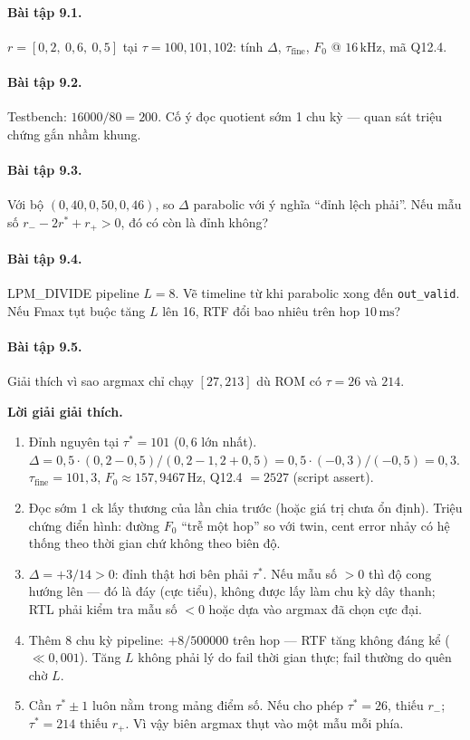 \paragraph{Bài tập 9.1.} $r = [0{,}2,\ 0{,}6,\ 0{,}5]$ tại $\tau = 100,101,102$: tính $\Delta$, $\tau_{\mathrm{fine}}$, $F_0$ @ $16\,\text{kHz}$, mã Q12.4.

\paragraph{Bài tập 9.2.} Testbench: $16000/80 = 200$. Cố ý đọc quotient sớm 1 chu kỳ --- quan sát triệu chứng gắn nhầm khung.

\paragraph{Bài tập 9.3.} Với bộ $(0{,}40,0{,}50,0{,}46)$, so $\Delta$ parabolic với ý nghĩa ``đỉnh lệch phải''. Nếu mẫu số $r_{-}-2r^{*}+r_{+} > 0$, đó có còn là đỉnh không?

\paragraph{Bài tập 9.4.} LPM\_DIVIDE pipeline $L=8$. Vẽ timeline từ khi parabolic xong đến \texttt{out\_valid}. Nếu Fmax tụt buộc tăng $L$ lên 16, RTF đổi bao nhiêu trên hop $10\,\text{ms}$?

\paragraph{Bài tập 9.5.} Giải thích vì sao argmax chỉ chạy $[27,213]$ dù ROM có $\tau=26$ và $214$.

\noindent\textbf{Lời giải giải thích.}
\begin{enumerate}[leftmargin=1.4em]
\item Đỉnh nguyên tại $\tau^{*} = 101$ ($0{,}6$ lớn nhất). $\Delta = 0{,}5\cdot(0{,}2-0{,}5)/(0{,}2-1{,}2+0{,}5) = 0{,}5\cdot(-0{,}3)/(-0{,}5) = 0{,}3$. $\tau_{\mathrm{fine}} = 101{,}3$, $F_0 \approx 157{,}9467\,\text{Hz}$, Q12.4 $= 2527$ (script assert).
\item Đọc sớm 1 ck lấy thương của lần chia trước (hoặc giá trị chưa ổn định). Triệu chứng điển hình: đường $F_0$ ``trễ một hop'' so với twin, cent error nhảy có hệ thống theo thời gian chứ không theo biên độ.
\item $\Delta = +3/14 > 0$: đỉnh thật hơi bên phải $\tau^{*}$. Nếu mẫu số $>0$ thì độ cong hướng lên --- đó là đáy (cực tiểu), không được lấy làm chu kỳ dây thanh; RTL phải kiểm tra mẫu số $<0$ hoặc dựa vào argmax đã chọn cực đại.
\item Thêm 8 chu kỳ pipeline: $+8/500000$ trên hop --- RTF tăng không đáng kể ($\ll 0{,}001$). Tăng $L$ không phải lý do fail thời gian thực; fail thường do quên chờ $L$.
\item Cần $\tau^*\pm 1$ luôn nằm trong mảng điểm số. Nếu cho phép $\tau^*=26$, thiếu $r_{-}$; $\tau^*=214$ thiếu $r_{+}$. Vì vậy biên argmax thụt vào một mẫu mỗi phía.
\end{enumerate}
